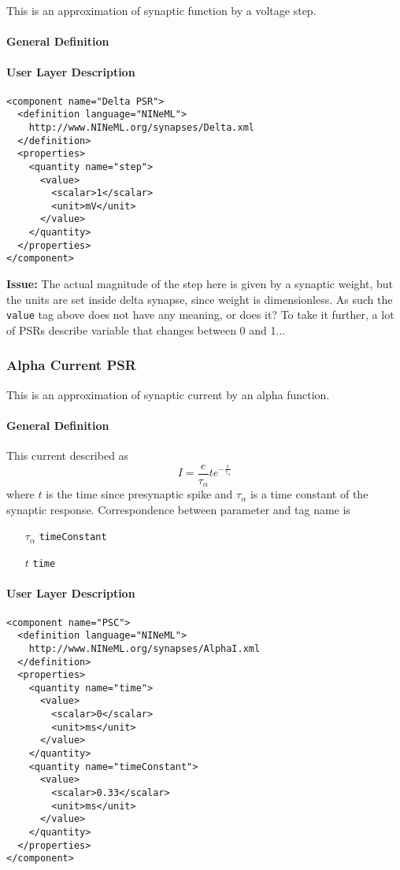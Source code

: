 \documentclass{article}
\newcommand{\issue}[1]{%
\begin{center}
\colorbox{issuecolor}{\parbox{0.8\linewidth}{\textbf{Issue:} #1}}
\end{center}%
}
\begin{document}
This is an approximation of synaptic function by a voltage step.

\paragraph{General Definition}

\paragraph{User Layer Description}
\begin{verbatim}
<component name="Delta PSR">
  <definition language="NINeML">
    http://www.NINeML.org/synapses/Delta.xml
  </definition>
  <properties>
    <quantity name="step">
      <value>
        <scalar>1</scalar>
        <unit>mV</unit>
      </value>
    </quantity>
  </properties>
</component>
\end{verbatim}

\issue{The actual magnitude of the step here is given by a synaptic weight,
but the units are set inside delta synapse, since weight is dimensionless.
As such the {\tt value} tag above does not have any meaning, or does it?
To take it further, a lot of PSRs describe variable that changes between
0 and 1...}

\subsubsection{Alpha Current PSR}

This is an approximation of synaptic current by an alpha function.

\paragraph{General Definition}
This current described as
\begin{equation}
I=\frac{e}{\tau_{\alpha}}te^{-\frac{t}{\tau_{\alpha}}}
\label{alphaC}
\end{equation}
where $t$ is the time since presynaptic spike and $\tau_{\alpha}$ is
a time constant of the synaptic response.
Correspondence between parameter and tag name is
\begin{itemize}
\item[$\tau_{\alpha}$] {\tt timeConstant}
\item[$t$] {\tt time}
\end{itemize}

\paragraph{User Layer Description}
\begin{verbatim}
<component name="PSC">
  <definition language="NINeML">
    http://www.NINeML.org/synapses/AlphaI.xml
  </definition>
  <properties>
    <quantity name="time">
      <value>
        <scalar>0</scalar>
        <unit>ms</unit>
      </value>
    </quantity>
    <quantity name="timeConstant">
      <value>
        <scalar>0.33</scalar>
        <unit>ms</unit>
      </value>
    </quantity>
  </properties>
</component>
\end{verbatim}
\end{document}
